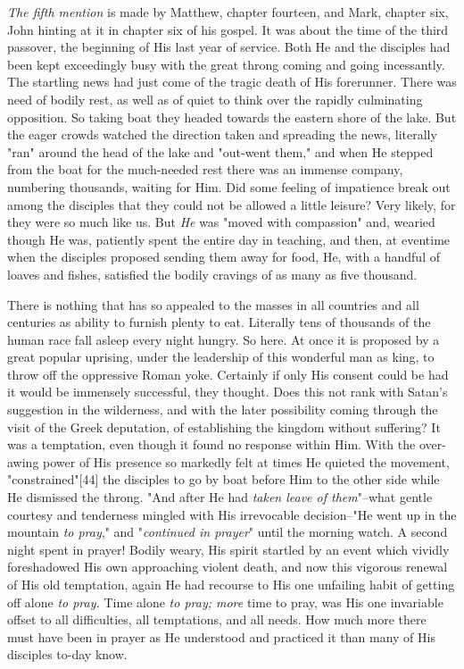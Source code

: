 \textit{The fifth mention} is made by Matthew, chapter fourteen, and Mark,
chapter six, John hinting at it in chapter six of his gospel. It was about
the time of the third passover, the beginning of His last year of service.
Both He and the disciples had been kept exceedingly busy with the great
throng coming and going incessantly. The startling news had just come of
the tragic death of His forerunner. There was need of bodily rest, as well
as of quiet to think over the rapidly culminating opposition. So taking
boat they headed towards the eastern shore of the lake. But the eager
crowds watched the direction taken and spreading the news, literally "ran"
around the head of the lake and "out-went them," and when He stepped from
the boat for the much-needed rest there was an immense company, numbering
thousands, waiting for Him. Did some feeling of impatience break out among
the disciples that they could not be allowed a little leisure? Very
likely, for they were so much like us. But \textit{He} was "moved with
compassion" and, wearied though He was, patiently spent the entire day in
teaching, and then, at eventime when the disciples proposed sending them
away for food, He, with a handful of loaves and fishes, satisfied the
bodily cravings of as many as five thousand.

There is nothing that has so appealed to the masses in all countries and
all centuries as ability to furnish plenty to eat. Literally tens of
thousands of the human race fall asleep every night hungry. So here. At
once it is proposed by a great popular uprising, under the leadership of
this wonderful man as king, to throw off the oppressive Roman yoke.
Certainly if only His consent could be had it would be immensely
successful, they thought. Does this not rank with Satan's suggestion in
the wilderness, and with the later possibility coming through the visit of
the Greek deputation, of establishing the kingdom without suffering? It
was a temptation, even though it found no response within Him. With the
over-awing power of His presence so markedly felt at times He quieted the
movement, "constrained"[44] the disciples to go by boat before Him to the
other side while He dismissed the throng. "And after He had \textit{taken leave
of them}"--what gentle courtesy and tenderness mingled with His
irrevocable decision--"He went up in the mountain \textit{to pray}," and
"\textit{continued in prayer}" until the morning watch. A second night spent in
prayer! Bodily weary, His spirit startled by an event which vividly
foreshadowed His own approaching violent death, and now this vigorous
renewal of His old temptation, again He had recourse to His one unfailing
habit of getting off alone \textit{to pray.} Time alone \textit{to pray; more} time to
pray, was His one invariable offset to all difficulties, all temptations,
and all needs. How much more there must have been in prayer as He
understood and practiced it than many of His disciples to-day know.



